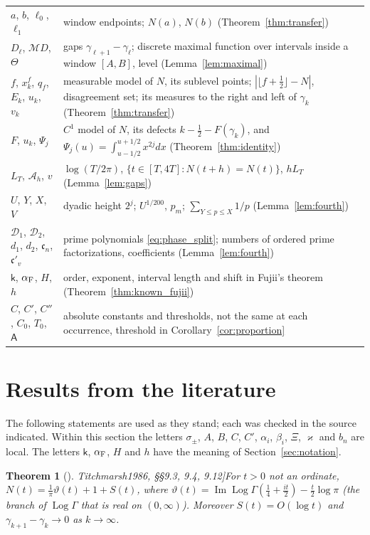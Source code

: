 \documentclass[11pt,a4paper]{article}
\makeatletter
\numberwithin{equation}{section}
\DeclareRobustCommand{\CGref}[1]{\ref{#1}}
\DeclareRobustCommand{\CGeqref}[1]{\eqref{#1}}
\DeclareRobustCommand{\CGcite}[2][]{\if\relax\detokenize{#1}\relax\cite{#2}\else\cite[#1]{#2}\fi}
\let\CG@origref\ref
\let\CG@origeqref\eqref
\newcommand{\CG@gettip}[1]{\@ifundefined{CGTip@#1}{#1}{\csname CGTip@#1\endcsname}}
\newcommand{\CG@getbib}[1]{\@ifundefined{CGBib@#1}{#1}{\csname CGBib@#1\endcsname}}
\DeclareRobustCommand{\CGref}[1]{\pdftooltip{\CG@origref{#1}}{\CG@gettip{#1}}}
\DeclareRobustCommand{\CGeqref}[1]{\pdftooltip{\CG@origeqref{#1}}{\CG@gettip{#1}}}
\DeclareRobustCommand{\CGcite}[2][]{\pdftooltip{\if\relax\detokenize{#1}\relax\cite{#2}\else\cite[#1]{#2}\fi}{\CG@getbib{#2}}}
\newtheorem{theorem}{Theorem}[section]
\theoremstyle{definition}
\theoremstyle{remark}
\newcommand{\M}{\mathcal M}
\makeatother
\begin{document}
\begin{center}
\begin{longtable}{p{}p{}}
$a$, $b$, $\ell_0$, $\ell_1$ & window endpoints; $N(a)$, $N(b)$ (Theorem~\CGref{thm:transfer})\\
$D_\ell$, $\M D$, $\Theta$ & gaps $\gamma_{\ell+1}-\gamma_\ell$; discrete maximal function over intervals inside a window $[A,B]$, level (Lemma~\CGref{lem:maximal})\\
$f$, $x^f_k$, $q_f$, $E_k$, $u_k$, $v_k$ & measurable model of $N$, its sublevel points; $|\lfloor f+\frac12\rfloor-N|$, disagreement set; its measures to the right and left of $\gamma_k$ (Theorem~\CGref{thm:transfer})\\
$F$, $u_k$, $\Psi_j$ & $C^1$ model of $N$, its defects $k-\frac12-F(\gamma_k)$, and $\Psi_j(u)=\int_{u-1/2}^{u+1/2}x^{2j}dx$ (Theorem~\CGref{thm:identity})\\
$L_T$, $\mathcal A_h$, $v$ & $\log(T/2\pi)$, $\{t\in[T,4T]:N(t+h)=N(t)\}$, $hL_T$ (Lemma~\CGref{lem:gaps})\\
$U$, $Y$, $X$, $V$ & dyadic height $2^j$; $U^{1/200}$, $p_m$; $\sum_{Y\le p\le X}1/p$ (Lemma~\CGref{lem:fourth})\\
$\mathscr D_1$, $\mathscr D_2$, $d_1$, $d_2$, $\mathfrak c_n$, $\mathfrak c'_v$ & prime polynomials \CGeqref{eq:phase_split}; numbers of ordered prime factorizations, coefficients (Lemma~\CGref{lem:fourth})\\
$\mathsf k$, $\alpha_{\rm F}$, $H$, $h$ & order, exponent, interval length and shift in Fujii's theorem (Theorem~\CGref{thm:known_fujii})\\
$C$, $C'$, $C''$, $C_0$, $T_0$, $\mathsf A$ & absolute constants and thresholds, not the same at each occurrence, threshold in Corollary~\CGref{cor:proportion}\\
\end{longtable}
\end{center}

\section{Results from the literature}\label{sec:external}

The following statements are used as they stand; each was checked in the source indicated. Within this section the letters $\sigma_\pm$, $A$, $B$, $C$, $C'$, $\alpha_i$, $\beta_i$, $\Xi$, $\varkappa$ and $b_n$ are local. The letters $\mathsf k$, $\alpha_{\rm F}$, $H$ and $h$ have the meaning of Section~\CGref{sec:notation}.

\begin{theorem}[\CGcite{Titchmarsh1986}, \S\S9.3, 9.4, 9.12]\label{thm:known_basic}
For $t>0$ not an ordinate, $N(t)=\frac1\pi\vartheta(t)+1+S(t)$, where $\vartheta(t)=\operatorname{Im}\operatorname{Log}\Gamma(\frac14+\frac{it}2)-\frac t2\log\pi$ (the branch of $\operatorname{Log}\Gamma$ that is real on $(0,\infty)$). Moreover $S(t)=O(\log t)$ and $\gamma_{k+1}-\gamma_k\to0$ as $k\to\infty$.
\end{theorem}
\end{document}
